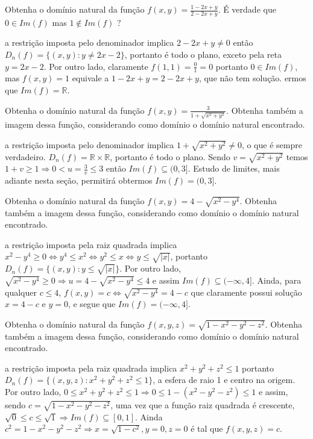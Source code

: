 \begin{exeresol}
Obtenha o domínio natural da função $f(x,y) = \frac{1-2x+y}{2-2x+y}$. É verdade que $0 \in Im(f)$ mas $1 \notin Im(f)$ ? 
\end{exeresol}
\begin{resol}
a restrição imposta pelo denominador implica $2-2x+y \neq 0$ então $D_n(f) = \{(x,y) : y \neq 2x - 2\}$, portanto é todo o plano, exceto pela reta $y=2x-2$. Por outro lado, claramente $f(1,1) = \frac{0}{1} = 0$ portanto $0 \in Im(f)$, mas $f(x,y)=1 $ equivale a $1-2x+y = 2-2x+y$, que não tem solução. ermos que $Im(f)=\mathbb{R}$.
\end{resol}
\begin{exeresol}
Obtenha o domínio natural da função $f(x,y) = \frac{3}{1+\sqrt{x^2+y^2}}$. Obtenha também a imagem dessa função, considerando como domínio o domínio natural encontrado.
\end{exeresol}
\begin{resol}
a restrição imposta pelo denominador implica $1 + \sqrt{x^2+y^2} \neq 0$, o que é sempre verdadeiro. $D_n(f) = \mathbb{R}\times \mathbb{R}$, portanto é todo o plano. Sendo $v = \sqrt{x^2+y^2}$ temos $1 + v \geq 1 \Rightarrow 0 < u = \frac{3}{v} \leq 3$ então $Im(f) \subseteq (0,3]$. Estudo de limites, mais adiante nesta seção, permitirá obtermos $Im(f) = (0,3]$.
\end{resol}

\begin{exeresol}
Obtenha o domínio natural da função $f(x,y) = 4-\sqrt{x^2-y^4}$. Obtenha também a imagem dessa função, considerando como domínio o domínio natural encontrado.
\end{exeresol}
\begin{resol}
a restrição imposta pela raiz quadrada implica $x^2-y^4 \geq 0 \Leftrightarrow y^4 \leq x^2 \Leftrightarrow y^2 \leq x \Leftrightarrow y \leq \sqrt{|x|}$, portanto $D_n(f) = \{(x,y) : y \leq \sqrt{|x|} \}$. Por outro lado, $\sqrt{x^2-y^4} \geq 0 \Rightarrow u = 4 - \sqrt{x^2-y^4} \leq 4$ e assim $Im(f) \subseteq (-\infty,4]$. Ainda, para qualquer $c \leq 4$, $f(x,y)=c \Leftrightarrow \sqrt{x^2-y^4} = 4-c $ que claramente possui solução $x=4-c$ e $y=0$, e segue que  $Im(f) = (-\infty,4]$.
\end{resol}

\begin{exeresol}
Obtenha o domínio natural da função $f(x,y,z) = \sqrt{1-x^2 -y^2 - z^2}$. Obtenha também a imagem dessa função, considerando como domínio o domínio natural encontrado.
\end{exeresol}
\begin{resol}
a restrição imposta pela raiz quadrada implica $x^2 + y^2 + z^2 \leq 1$ portanto $D_n(f) = \{ (x,y,z) : x^2 + y^2 + z^2 \leq 1\}$, a esfera de raio 1 e centro na origem. Por outro lado, $0 \leq x^2 + y^2 + z^2 \leq 1 \Rightarrow 0 \leq 1-(x^2-y^2-z^2) \leq 1$ e assim, sendo $c=\sqrt{1-x^2-y^2-z^2}$, uma vez que a função raiz quadrada é crescente, $\sqrt{0} \leq c \leq \sqrt{1} \Rightarrow Im(f) \subseteq [0 , 1]$. Ainda $c^2 = 1-x^2-y^2-z^2 \Rightarrow x=\sqrt{1-c^2}, y=0, z=0$ é tal que $f(x,y,z)=c$.
\end{resol}


